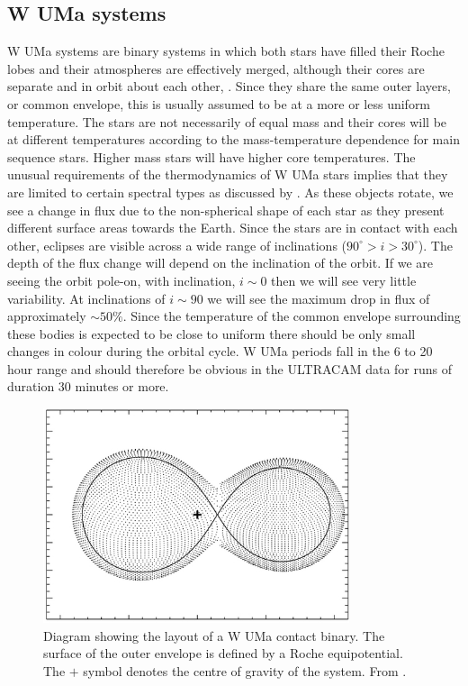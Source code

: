 \subsection{{W UMa} systems}
{W UMa} systems are binary systems in which both stars have filled their Roche lobes and their atmospheres are effectively merged, although their cores are separate and in orbit about each other, \citep{Lucy68}. Since they share the same outer layers, or common envelope, this is usually assumed to be at a more or less uniform temperature. The stars are not necessarily of equal mass and their cores will be at different temperatures according to the mass-temperature dependence for main sequence stars. Higher mass stars will have higher core temperatures. The unusual requirements of the thermodynamics of W UMa stars implies that they are limited to certain spectral types as discussed by \citeauthor{Lucy68}.  As these objects rotate, we see a change in flux due to the non-spherical shape of each star as they present different surface areas towards the Earth. Since the stars are in contact with each other, eclipses are visible across a wide range of inclinations ($90^\circ > i > 30^\circ$). The depth of the flux change will depend on the inclination of the orbit. If we are seeing the orbit pole-on, with inclination, $i \sim 0$ then we will see very little variability. At inclinations of $i \sim 90$ we will see the maximum drop in flux of approximately $\sim50\%$. Since the temperature of the common envelope surrounding these bodies is expected to be close to uniform there should be only small changes in colour during the orbital cycle. W UMa periods fall in the 6 to 20 hour range and should therefore be obvious in the ULTRACAM data for runs of duration 30 minutes or more. 

\begin{figure}
\centering
\includegraphics[width=90mm]{images/wuma_diagram.png}
\caption{Diagram showing the layout of a {W UMa} contact binary. The surface of the outer envelope is defined by a Roche equipotential. The $+$ symbol denotes the centre of gravity of the system.  From \citet{0004-637X-764-1-62}. }
\label{fig:wumadiagram}
\end{figure}

